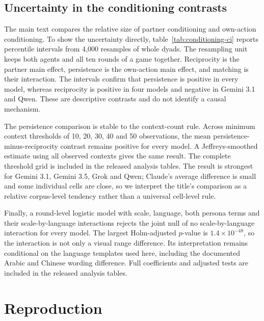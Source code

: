 \documentclass[openacc]{rsproca_new}
\begin{document}


\subsection{Uncertainty in the conditioning contrasts}\label{appendix:conditioning_ci}

The main text compares the relative size of partner conditioning and own-action
conditioning. To show the uncertainty directly, table~\ref{tab:conditioning-ci}
reports percentile intervals from 4,000 resamples of whole dyads. The resampling
unit keeps both agents and all ten rounds of a game together. Reciprocity is the
partner main effect, persistence is the own-action main effect, and matching is
their interaction. The intervals confirm that persistence is positive in every
model, whereas reciprocity is positive in four models and negative in Gemini
3.1 and Qwen. These are descriptive contrasts and do not identify a causal
mechanism.

The persistence comparison is stable to the context-count rule. Across minimum
context thresholds of 10, 20, 30, 40 and 50 observations, the mean
persistence-minus-reciprocity contrast remains positive for every model. A
Jeffreys-smoothed estimate using all observed contexts gives the same result.
The complete threshold grid is included in the released analysis tables. The result is strongest for
Gemini 3.1, Gemini 3.5, Grok and Qwen; Claude's average difference is small and
some individual cells are close, so we interpret the title's comparison as a
relative corpus-level tendency rather than a universal cell-level rule.

Finally, a round-level logistic model with scale, language, both persona terms
and their scale-by-language interactions rejects the joint null of no
scale-by-language interaction for every model. The largest Holm-adjusted
$p$-value is $1.4\times10^{-48}$, so the interaction is not only a visual
range difference. Its interpretation remains conditional on the language
templates used here, including the documented Arabic and Chinese wording
difference. Full coefficients and adjusted tests are included in the released
analysis tables.



\section{Reproduction}\label{appendix:repro}
\end{document}
